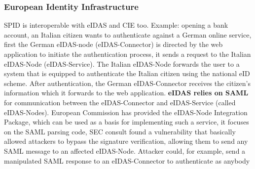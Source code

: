 \subsubsection{European Identity Infrastructure}
SPID is interoperable with eIDAS and CIE too. Example: opening a bank account, an Italian citizen wants to authenticate against a German online service, first the German eIDAS-node (eIDAS-Connector) is directed by the web application to initiate the authentication process, it sends a request to the Italian eIDAS-Node (eIDAS-Service). The Italian eIDAS-Node forwards the user to a system that is equipped to authenticate the Italian citizen using the national eID scheme. After authentication, the German eIDAS-Connector receives the citizen's information which it forwards to the web application. \textbf{eIDAS relies on SAML} for communication between the eIDAS-Connector and eIDAS-Service (called eIDAS-Nodes).
European Commission has provided the eIDAS-Node Integration Package, which can be used as a basis for implementing such a service, it focuses on the SAML parsing code, SEC consult found a vulnerability that basically allowed attackers to bypass the signature verification, allowing them to send any SAML message to an affected eIDAS-Node. Attacker could, for example, send a manipulated SAML response to an eIDAS-Connector to authenticate as anybody